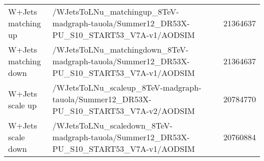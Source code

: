 \begin{sidewaystable}
\begin{center}
\begin{tabular}{|l| p{11.5cm} |c|c|}
\hline
	W+Jets matching up & /WJetsToLNu\_matchingup\_8TeV-madgraph-tauola/Summer12\_DR53X-PU\_S10\_START53\_V7A-v1/AODSIM & & 21364637\\
	W+Jets matching down & /WJetsToLNu\_matchingdown\_8TeV-madgraph-tauola/Summer12\_DR53X-PU\_S10\_START53\_V7A-v1/AODSIM & & 21364637\\
	W+Jets scale up & /WJetsToLNu\_scaleup\_8TeV-madgraph-tauola/Summer12\_DR53X-PU\_S10\_START53\_V7A-v2/AODSIM & & 20784770\\
	W+Jets scale down & /WJetsToLNu\_scaledown\_8TeV-madgraph-tauola/Summer12\_DR53X-PU\_S10\_START53\_V7A-v1/AODSIM & & 20760884\\
\hline
\end{tabular}
\end{center}
\caption{}
\end{sidewaystable}